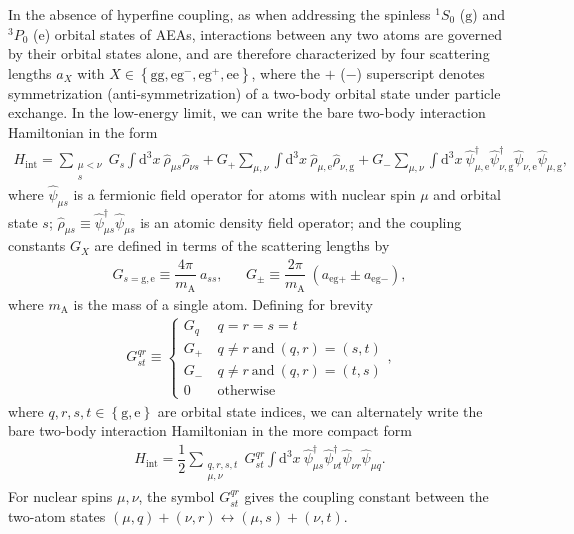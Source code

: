 \documentclass[preprint,showkeys,nofootinbib]{revtex4-1}
\renewcommand{\t}{\text} %
\newcommand{\f}{\dfrac} %
\newcommand{\p}[1]{\left(#1\right)} %
\renewcommand{\set}[1]{\left\{#1\right\}} %
\renewcommand{\d}{\text{d}}
\newcommand{\g}{\text{g}}
\newcommand{\e}{\text{e}}
\newcommand{\1}{\mathds{1}}
\newcommand{\mA}{m_{\text{A}}} %
\begin{document}
In the absence of hyperfine coupling, as when addressing the spinless
${}^1S_0$ ($\g$) and ${}^3P_0$ ($\e$) orbital states of AEAs,
interactions between any two atoms are governed by their orbital
states alone, and are therefore characterized by four scattering
lengths $a_X$ with $X\in\set{\g\g,\e\g^-,\e\g^+,\e\e}$, where the $+$
($-$) superscript denotes symmetrization (anti-symmetrization) of a
two-body orbital state under particle exchange.  In the low-energy
limit, we can write the bare two-body interaction Hamiltonian in the
form \cite{gorshkov2010twoorbital}
\begin{align}
  H_{\t{int}} = \sum_{\substack{\mu<\nu\\s}}
  G_s \int \d^3x~ \hat\rho_{\mu s} \hat\rho_{\nu s}
  + G_+ \sum_{\mu,\nu}
  \int \d^3x~ \hat\rho_{\mu,\e} \hat\rho_{\nu,\g}
  + G_- \sum_{\mu,\nu} \int \d^3x~
  \hat\psi_{\mu,\e}^\dag \hat\psi_{\nu,\g}^\dag
  \hat\psi_{\nu,\e} \hat\psi_{\mu,\g},
  \label{eq:H_int_start}
\end{align}
where $\hat\psi_{\mu s}$ is a fermionic field operator for atoms with
nuclear spin $\mu$ and orbital state $s$;
$\hat\rho_{\mu s}\equiv\hat\psi_{\mu s}^\dag\hat\psi_{\mu s}$ is an
atomic density field operator; and the coupling constants $G_X$ are
defined in terms of the scattering lengths by
\begin{align}
  G_{s=\g,\e} \equiv \f{4\pi}{\mA}~ a_{ss}, &&
  G_\pm \equiv \f{2\pi}{\mA}~ \p{a_{\e\g+} \pm a_{\e\g-}},
  \label{eq:couplings}
\end{align}
where $\mA$ is the mass of a single atom.  Defining for brevity
\begin{align}
  G^{qr}_{st} \equiv \left\{
    \begin{array}{ll}
      G_q & ~ q = r = s = t \\
      G_+ & ~ q \ne r ~ \t{and} ~ (q,r) = (s,t) \\
      G_- & ~ q \ne r ~ \t{and} ~ (q,r) = (t,s) \\
      0 & ~ \t{otherwise}
    \end{array}\right.,
  \label{eq:coupling_tensor}
\end{align}
where $q,r,s,t\in\set{\g,\e}$ are orbital state indices, we can
alternately write the bare two-body interaction Hamiltonian in the
more compact form
\begin{align}
  H_{\t{int}}
  = \f12 \sum_{\substack{q,r,s,t\\\mu,\nu}} G^{qr}_{st} \int \d^3x~
  \hat\psi_{\mu s}^\dag \hat\psi_{\nu t}^\dag
  \hat\psi_{\nu r} \hat\psi_{\mu q}.
  \label{eq:H_int_fields}
\end{align}
For nuclear spins $\mu,\nu$, the symbol $G^{qr}_{st}$ gives the
coupling constant between the two-atom states
$(\mu,q)+(\nu,r)\leftrightarrow(\mu,s)+(\nu,t)$.
\end{document}
